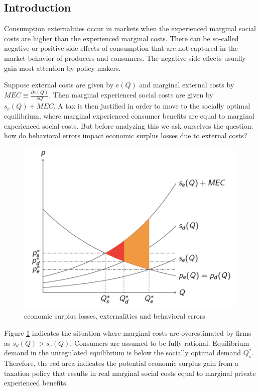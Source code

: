 \documentclass[
]{book}
\begin{document}
\hypertarget{introduction-9}{%
\subsection{Introduction}\label{introduction-9}}

Consumption externalities occur in markets when the experienced marginal social costs are higher than the experienced marginal costs. There can be so-called negative or positive side effects of consumption that are not captured in the market behavior of producers and consumers. The negative side effects usually gain most attention by policy makers.

Suppose external costs are given by \(e(Q)\) and marginal external costs by \(MEC \equiv \frac{\partial e(Q)}{\partial Q}\). Then marginal experienced social costs are given by \(s_e (Q)+MEC\). A tax is then justified in order to move to the socially optimal equilibrium, where marginal experienced consumer benefits are equal to marginal experienced social costs. But before analyzing this we ask ourselves the question: how do behavioral errors impact economic surplus losses due to external costs?

\begin{figure}
\includegraphics[width=12.92in]{./figures/econsurplusexterrors} \caption{economic surplus losses, externalities and behavioral errors}\label{fig:econsurplusexterrors}
\end{figure}

Figure \ref{fig:econsurplusexterrors} indicates the situation where marginal costs are overestimated by firms as \(s_d (Q)>s_e (Q)\). Consumers are assumed to be fully rational. Equilibrium demand in the unregulated equilibrium is below the socially optimal demand \(Q_s^*\). Therefore, the red area indicates the potential economic surplus gain from a taxation policy that results in real marginal social costs equal to marginal private experienced benefits.
\end{document}
